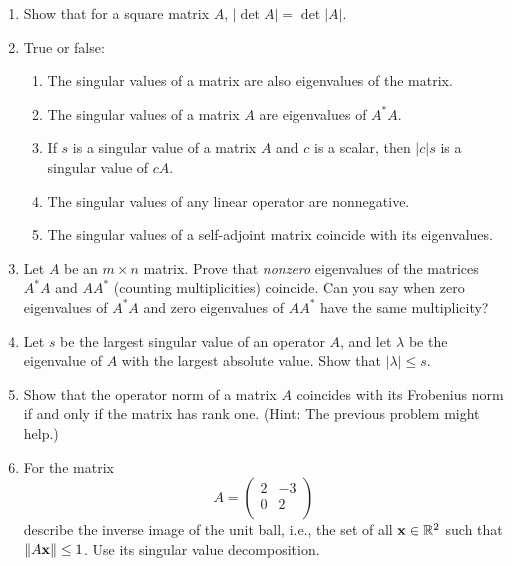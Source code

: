 \documentclass[../psets.tex]{subfiles}
\begin{document}
\begin{enumerate}[label={\textbf{3.\arabic*.}}]
    \item Show that for a square matrix $A$, $|\det A|=\det|A|$.
    \item True or false:
    \begin{enumerate}
        \item The singular values of a matrix are also eigenvalues of the matrix.
        \item The singular values of a matrix $A$ are eigenvalues of $A^*A$.
        \item If $s$ is a singular value of a matrix $A$ and $c$ is a scalar, then $|c|s$ is a singular value of $cA$.
        \item The singular values of any linear operator are nonnegative.
        \item The singular values of a self-adjoint matrix coincide with its eigenvalues.
    \end{enumerate}
    \item Let $A$ be an $m\times n$ matrix. Prove that \emph{nonzero} eigenvalues of the matrices $A^*A$ and $AA^*$ (counting multiplicities) coincide. Can you say when zero eigenvalues of $A^*A$ and zero eigenvalues of $AA^*$ have the same multiplicity?
    \item Let $s$ be the largest singular value of an operator $A$, and let $\lambda$ be the eigenvalue of $A$ with the largest absolute value. Show that $|\lambda|\leq s$.
    \item Show that the operator norm of a matrix $A$ coincides with its Frobenius norm if and only if the matrix has rank one. (Hint: The previous problem might help.)
    \item For the matrix
    \begin{equation*}
        A =
        \begin{pmatrix}
            2 & -3\\
            0 & 2\\
        \end{pmatrix}
    \end{equation*}
    describe the inverse image of the unit ball, i.e., the set of all $\mathbf{x}\in\mathbb{R}^2$ such that $\norm{A\mathbf{x}}\leq 1$. Use its singular value decomposition.
\end{enumerate}
\end{document}
